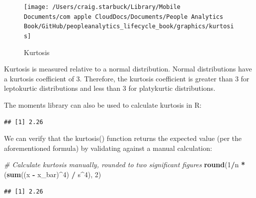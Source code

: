 \documentclass[]{book}
\newenvironment{Shaded}{\begin{snugshade}}{\end{snugshade}}
\newcommand{\CommentTok}[1]{\textcolor[rgb]{0.56,0.35,0.01}{\textit{#1}}}
\newcommand{\DecValTok}[1]{\textcolor[rgb]{0.00,0.00,0.81}{#1}}
\newcommand{\KeywordTok}[1]{\textcolor[rgb]{0.13,0.29,0.53}{\textbf{#1}}}
\newcommand{\NormalTok}[1]{#1}
\newcommand{\OperatorTok}[1]{\textcolor[rgb]{0.81,0.36,0.00}{\textbf{#1}}}
\newcommand{\StringTok}[1]{\textcolor[rgb]{0.31,0.60,0.02}{#1}}
\begin{document}
\begin{figure}

{\centering \texttt{[image: /Users/craig.starbuck/Library/Mobile Documents/com~apple~CloudDocs/Documents/People Analytics Book/GitHub/peopleanalytics\_lifecycle\_book/graphics/kurtosis]} 

}

\caption{Kurtosis}\label{fig:kurtosis}
\end{figure}

Kurtosis is measured relative to a normal distribution. Normal distributions have a kurtosis coefficient of 3. Therefore, the kurtosis coefficient is greater than 3 for leptokurtic distributions and less than 3 for platykurtic distributions.

The moments library can also be used to calculate kurtosis in R:

\begin{Shaded}
\end{Shaded}

\begin{verbatim}
## [1] 2.26
\end{verbatim}

We can verify that the kurtosis() function returns the expected value (per the aforementioned formula) by validating against a manual calculation:

\begin{Shaded}
\begin{Highlighting}[]
\CommentTok{# Calculate kurtosis manually, rounded to two significant figures}
\KeywordTok{round}\NormalTok{(}\DecValTok{1}\OperatorTok{/}\NormalTok{n }\OperatorTok{*}\StringTok{ }\NormalTok{(}\KeywordTok{sum}\NormalTok{((x }\OperatorTok{-}\StringTok{ }\NormalTok{x_bar)}\OperatorTok{^}\DecValTok{4}\NormalTok{) }\OperatorTok{/}\StringTok{ }\NormalTok{s}\OperatorTok{^}\DecValTok{4}\NormalTok{), }\DecValTok{2}\NormalTok{)}
\end{Highlighting}
\end{Shaded}

\begin{verbatim}
## [1] 2.26
\end{verbatim}
\end{document}
